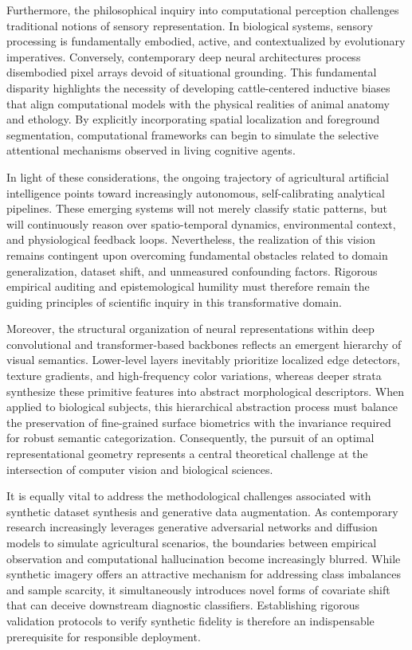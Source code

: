 \documentclass[Times,12pt,oneside,openany,print,index]{report}
\begin{document}
Furthermore, the philosophical inquiry into computational perception challenges traditional notions of sensory representation. In biological systems, sensory processing is fundamentally embodied, active, and contextualized by evolutionary imperatives. Conversely, contemporary deep neural architectures process disembodied pixel arrays devoid of situational grounding. This fundamental disparity highlights the necessity of developing cattle-centered inductive biases that align computational models with the physical realities of animal anatomy and ethology. By explicitly incorporating spatial localization and foreground segmentation, computational frameworks can begin to simulate the selective attentional mechanisms observed in living cognitive agents.

In light of these considerations, the ongoing trajectory of agricultural artificial intelligence points toward increasingly autonomous, self-calibrating analytical pipelines. These emerging systems will not merely classify static patterns, but will continuously reason over spatio-temporal dynamics, environmental context, and physiological feedback loops. Nevertheless, the realization of this vision remains contingent upon overcoming fundamental obstacles related to domain generalization, dataset shift, and unmeasured confounding factors. Rigorous empirical auditing and epistemological humility must therefore remain the guiding principles of scientific inquiry in this transformative domain.

Moreover, the structural organization of neural representations within deep convolutional and transformer-based backbones reflects an emergent hierarchy of visual semantics. Lower-level layers inevitably prioritize localized edge detectors, texture gradients, and high-frequency color variations, whereas deeper strata synthesize these primitive features into abstract morphological descriptors. When applied to biological subjects, this hierarchical abstraction process must balance the preservation of fine-grained surface biometrics with the invariance required for robust semantic categorization. Consequently, the pursuit of an optimal representational geometry represents a central theoretical challenge at the intersection of computer vision and biological sciences.

It is equally vital to address the methodological challenges associated with synthetic dataset synthesis and generative data augmentation. As contemporary research increasingly leverages generative adversarial networks and diffusion models to simulate agricultural scenarios, the boundaries between empirical observation and computational hallucination become increasingly blurred. While synthetic imagery offers an attractive mechanism for addressing class imbalances and sample scarcity, it simultaneously introduces novel forms of covariate shift that can deceive downstream diagnostic classifiers. Establishing rigorous validation protocols to verify synthetic fidelity is therefore an indispensable prerequisite for responsible deployment.
\end{document}
